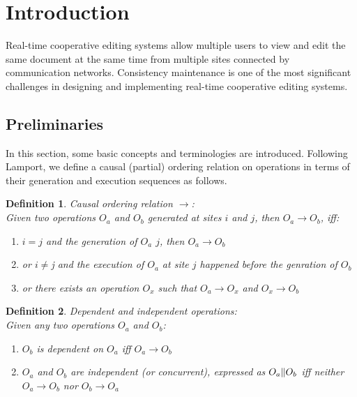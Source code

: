 \documentclass[11pt,a4paper]{article}
\begin{document}
\setlength{\parindent}{0pt}

\newtheorem{defn}{Definition}




\newpage

\tableofcontents
\newpage
\listoftables
\listoffigures
\newpage



\newpage


\section{Introduction}
Real-time cooperative editing systems allow multiple users to view and edit the same document at the same time from multiple sites connected by communication networks. Consistency maintenance is one of the most significant challenges in designing and implementing real-time cooperative editing systems. 

\subsection{Preliminaries}
In this section, some basic concepts and terminologies are introduced. Following Lamport\cite{lamport78}, we define a causal (partial) ordering relation on operations in terms of their generation and execution sequences as follows.

\begin{defn}
Causal ordering relation $\rightarrow$: \\
Given two operations $O_{a}$ and $O_{b}$ generated at sites $i$ and $j$, then $O_{a}\rightarrow O_{b}$, iff:
\begin{enumerate}
 \item $i=j$ and the generation of $O_{a}$ $j$, then $O_{a}\rightarrow O_{b}$
 \item or $i \neq $j and the execution of $O_{a}$ at site $j$ happened before the 
       genration of $O_{b}$
 \item or there exists an operation $O_{x}$ such that $O_{a}\rightarrow O_{x}$
       and $O_{x}\rightarrow O_{b}$
\end{enumerate}
\end{defn}

\begin{defn}
Dependent and independent operations: \\
Given any two operations $O_{a}$ and $O_{b}$:
\begin{enumerate}
 \item $O_{b}$ is \emph{dependent} on $O_{a}$ iff $O_{a} \rightarrow O_{b}$
 \item $O_{a}$ and $O_{b}$ are \emph{independent} (or \emph{concurrent}), expressed
       as $O_{a} \Arrowvert O_{b}$ iff neither $O_{a}\rightarrow O_{b}$ nor
       $O_{b}\rightarrow O_{a}$
\end{enumerate}
\end{defn}
\end{document}
